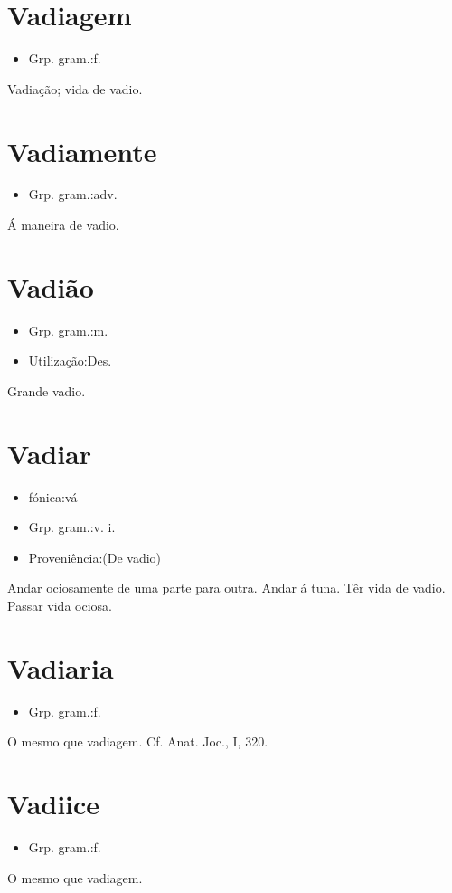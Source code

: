 \documentclass{article}
\begin{document}
\section{Vadiagem}
\begin{itemize}
\item {Grp. gram.:f.}
\end{itemize}
Vadiação; vida de vadio.
\section{Vadiamente}
\begin{itemize}
\item {Grp. gram.:adv.}
\end{itemize}
Á maneira de vadio.
\section{Vadião}
\begin{itemize}
\item {Grp. gram.:m.}
\end{itemize}
\begin{itemize}
\item {Utilização:Des.}
\end{itemize}
Grande vadio.
\section{Vadiar}
\begin{itemize}
\item {fónica:vá}
\end{itemize}
\begin{itemize}
\item {Grp. gram.:v. i.}
\end{itemize}
\begin{itemize}
\item {Proveniência:(De \textunderscore vadio\textunderscore )}
\end{itemize}
Andar ociosamente de uma parte para outra.
Andar á tuna.
Têr vida de vadio.
Passar vida ociosa.
\section{Vadiaria}
\begin{itemize}
\item {Grp. gram.:f.}
\end{itemize}
O mesmo que \textunderscore vadiagem\textunderscore . Cf. \textunderscore Anat. Joc.\textunderscore , I, 320.
\section{Vadiice}
\begin{itemize}
\item {Grp. gram.:f.}
\end{itemize}
O mesmo que \textunderscore vadiagem\textunderscore .
\end{document}
